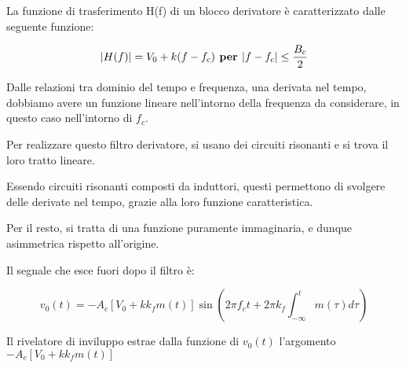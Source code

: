 La funzione di trasferimento H(f) di un blocco derivatore è caratterizzato dalle seguente funzione: 

{
    \Large
    \begin{equation}
        \abs{H(f)} = V_0 + k(f - f_c) \textbf{ per } \abs{f - f_c} \le \frac{B_c}{2}
    \end{equation}
}

\begin{tcolorbox}
Dalle relazioni tra dominio del tempo e frequenza, 
una derivata nel tempo, dobbiamo avere un funzione lineare nell'intorno della frequenza da considerare, 
in questo caso nell'intorno di $f_c$. \newline 

Per realizzare questo filtro derivatore, si usano dei circuiti risonanti e si trova il loro tratto lineare. \newline 

Essendo circuiti risonanti composti da induttori, questi permettono di svolgere delle derivate nel tempo, 
grazie alla loro funzione caratteristica. 
\end{tcolorbox}

Per il resto, si tratta di una funzione puramente immaginaria, e dunque asimmetrica rispetto all'origine. \newline 

Il segnale che esce fuori dopo il filtro è: 

{
    \Large 
    \begin{equation}
        v_0 (t)
        = 
        - A_c 
        \left[
            V_0 + k k_f m(t)
        \right]
        \sin 
        \left(
            2 \pi f_c t 
            + 
            2 \pi k_f 
            \int_{-\infty}^{t} m(\tau) d\tau
        \right)
    \end{equation}
}

Il rivelatore di inviluppo estrae dalla funzione di $v_0 (t)$ l'argomento $- A_c 
        \left[
            V_0 + k k_f m(t)
        \right]$

\newpage




